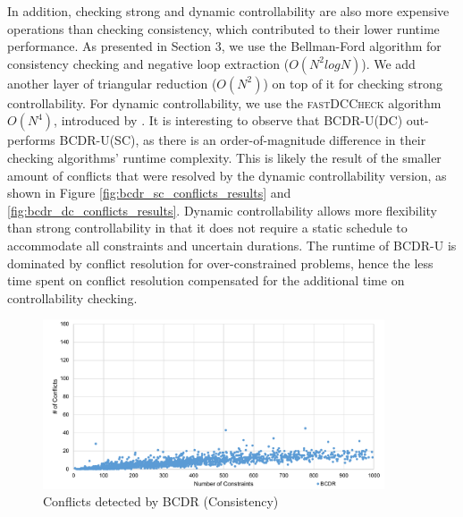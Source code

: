 \documentclass[jair,twoside,11pt,theapa]{article}
\begin{document}
%
%


In addition, checking strong and dynamic controllability are also more expensive
operations than checking consistency, which contributed to their lower runtime
performance. As presented in Section 3, we use the Bellman-Ford algorithm for
consistency checking and negative loop extraction ($O(N^2logN)$). We add another
layer of triangular reduction ($O(N^2)$) on top of it for checking strong
controllability. For dynamic controllability, we use the \textsc{fastDCCheck}
algorithm $O(N^4)$, introduced by . It is interesting to observe
that BCDR-U(DC) out-performs BCDR-U(SC), as there is an order-of-magnitude difference in their checking
algorithms' runtime complexity. This is likely the result of the smaller amount
of conflicts that were resolved by the dynamic controllability version, as shown
in Figure \ref{fig:bcdr_sc_conflicts_results} and
\ref{fig:bcdr_dc_conflicts_results}. Dynamic controllability allows more
flexibility than strong controllability in that it does not require a static
schedule to accommodate all constraints and uncertain durations. The runtime of
BCDR-U is dominated by conflict resolution for over-constrained problems, hence
the less time spent on conflict resolution compensated for the additional time
on controllability checking.


\begin{figure}[!ht]
	\centering
	\includegraphics[width=0.9\textwidth]{figures/results/bcdr_c_conflicts.pdf}
	\caption{Conflicts detected by BCDR (Consistency)}
	\label{fig:bcdr_conflicts_results}
\end{figure}
\end{document}
